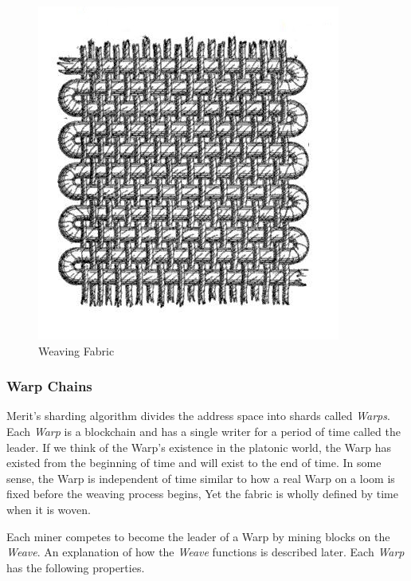 \documentclass{article}
\begin{document}
\begin{figure}[H]
    \begin{center}
        \includegraphics[scale=0.618]{fabric}
    \end{center}
    \caption{Weaving Fabric \cite{weave}}
\end{figure}

\subsubsection{Warp Chains}

Merit's sharding algorithm divides the address space into shards
called \emph{Warps}. Each \emph{Warp} is a blockchain and has a single writer
for a period of time called the leader. If we think of the Warp's existence in 
the platonic world, the Warp has existed from the beginning of time and will 
exist to the end of time. In some sense, the Warp is independent of time similar
to how a real Warp on a loom is fixed before the weaving process begins, Yet the
fabric is wholly defined by time when it is woven.

Each miner competes to become the leader of a Warp by mining blocks on the \emph{Weave}. An explanation of how the \emph{Weave} functions is described later. Each \emph{Warp} has the following properties.
\end{document}
